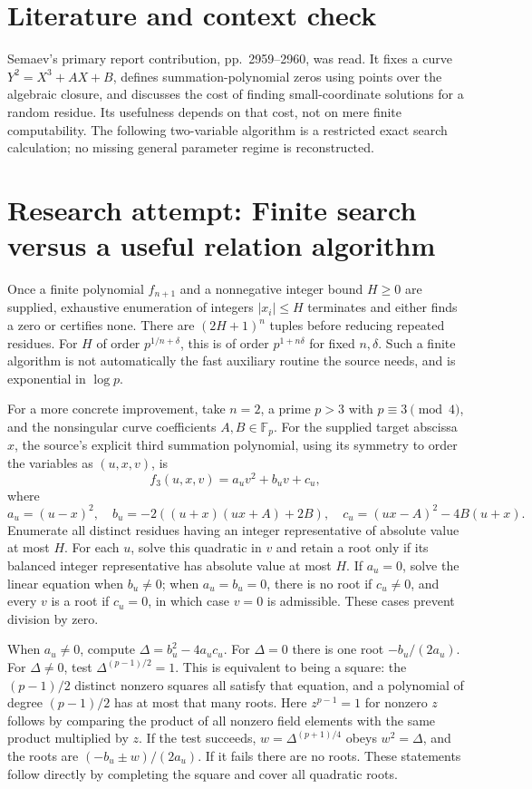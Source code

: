 \documentclass[11pt]{article}
\begin{document}
\section{Literature and context check}
Semaev's primary report contribution, pp.~2959--2960, was read. It fixes a curve $Y^2=X^3+AX+B$, defines summation-polynomial zeros using points over the algebraic closure, and discusses the cost of finding small-coordinate solutions for a random residue. Its usefulness depends on that cost, not on mere finite computability. The following two-variable algorithm is a restricted exact search calculation; no missing general parameter regime is reconstructed.
\section{Research attempt: Finite search versus a useful relation algorithm}
Once a finite polynomial $f_{n+1}$ and a nonnegative integer bound $H\geq0$ are supplied, exhaustive enumeration of integers $|x_i|\leq H$ terminates and either finds a zero or certifies none. There are $(2H+1)^n$ tuples before reducing repeated residues. For $H$ of order $p^{1/n+\delta}$, this is of order $p^{1+n\delta}$ for fixed $n,\delta$. Such a finite algorithm is not automatically the fast auxiliary routine the source needs, and is exponential in $\log p$.

For a more concrete improvement, take $n=2$, a prime $p>3$ with $p\equiv3\pmod4$, and the nonsingular curve coefficients $A,B\in\mathbb F_p$. For the supplied target abscissa $x$, the source's explicit third summation polynomial, using its symmetry to order the variables as $(u,x,v)$, is
\[
 f_3(u,x,v)=a_u v^2+b_u v+c_u,
\]
where
\[
 a_u=(u-x)^2,\quad b_u=-2((u+x)(ux+A)+2B),\quad
 c_u=(ux-A)^2-4B(u+x).
\]
Enumerate all distinct residues having an integer representative of absolute value at most $H$. For each $u$, solve this quadratic in $v$ and retain a root only if its balanced integer representative has absolute value at most $H$. If $a_u=0$, solve the linear equation when $b_u\ne0$; when $a_u=b_u=0$, there is no root if $c_u\ne0$, and every $v$ is a root if $c_u=0$, in which case $v=0$ is admissible. These cases prevent division by zero.

When $a_u\ne0$, compute $\Delta=b_u^2-4a_uc_u$. For $\Delta=0$ there is one root $-b_u/(2a_u)$. For $\Delta\ne0$, test $\Delta^{(p-1)/2}=1$. This is equivalent to being a square: the $(p-1)/2$ distinct nonzero squares all satisfy that equation, and a polynomial of degree $(p-1)/2$ has at most that many roots. Here $z^{p-1}=1$ for nonzero $z$ follows by comparing the product of all nonzero field elements with the same product multiplied by $z$. If the test succeeds, $w=\Delta^{(p+1)/4}$ obeys $w^2=\Delta$, and the roots are $(-b_u\pm w)/(2a_u)$. If it fails there are no roots. These statements follow directly by completing the square and cover all quadratic roots.
\end{document}
